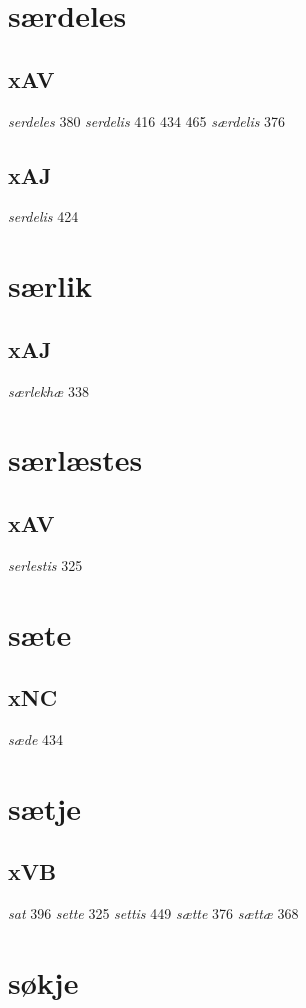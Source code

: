 \documentclass[a4paper,twocolumn]{article}
\begin{document}
\section{særdeles}
\label{sec:org553a483}
\subsection{xAV}
\label{sec:orgbf32d80}
\emph{serdeles} 380 \emph{serdelis} 416 434 465 \emph{særdelis} 376 
\subsection{xAJ}
\label{sec:orgeb2cf55}
\emph{serdelis} 424 
\section{særlik}
\label{sec:org199efda}
\subsection{xAJ}
\label{sec:orga7c16f6}
\emph{særlekhæ} 338 
\section{særlæstes}
\label{sec:orga6031ac}
\subsection{xAV}
\label{sec:org9f0c797}
\emph{serlestis} 325 
\section{sæte}
\label{sec:org14ed9be}
\subsection{xNC}
\label{sec:orga0febaa}
\emph{sæde} 434 
\section{sætje}
\label{sec:org1f8866d}
\subsection{xVB}
\label{sec:org7d8c646}
\emph{sat} 396 \emph{sette} 325 \emph{settis} 449 \emph{sætte} 376 \emph{sættæ} 368 
\section{søkje}
\label{sec:org2b5b402}
\end{document}

